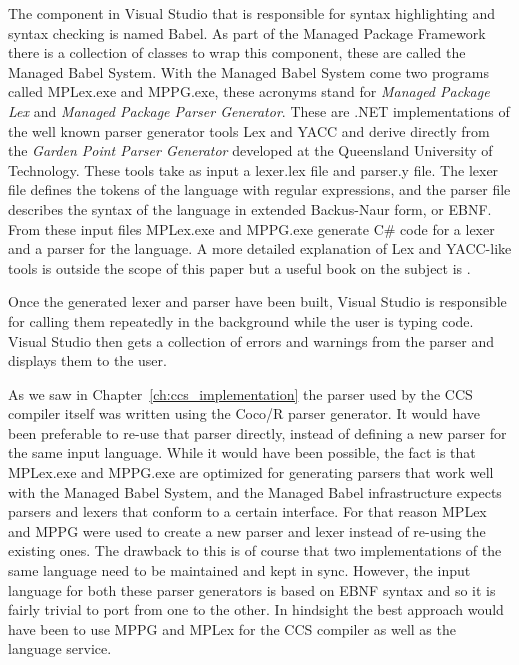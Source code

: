 	The component in Visual Studio that is responsible for syntax highlighting 
	and syntax checking is named Babel. As part of the Managed Package Framework 
	there is a collection of classes to wrap this component, these are called 
	the Managed Babel System. With the Managed Babel System come two programs 
	called MPLex.exe and MPPG.exe, these acronyms stand for \textit{Managed 
	Package Lex} and \textit{Managed Package Parser Generator}. These are .NET 
	implementations of the well known parser generator tools Lex and YACC and 
	derive directly from the \textit{Garden Point Parser Generator} \cite{gppg} 
	developed at the Queensland University of Technology. These tools take as 
	input a \textsf{lexer.lex} file and
	\textsf{parser.y} file. The lexer file defines the tokens of the language
	with regular expressions, and the parser file describes the syntax of the
	language in extended Backus-Naur form, or EBNF. From these input files 
	MPLex.exe and MPPG.exe generate C\# code for a lexer and a parser for the 
	language. A more detailed explanation of Lex and YACC-like tools is outside 
	the scope of this paper but a useful book on the subject is \cite{lexyacc}. 
	
	Once the generated lexer and parser have been built, Visual Studio is 
	responsible for calling them repeatedly in the background while the user is 
	typing code. Visual Studio then gets a collection of errors and warnings 
	from the parser and displays them to the user. 

	As we saw in Chapter~\ref{ch:ccs_implementation} the parser used by the CCS 
	compiler itself was written using the Coco/R parser generator. It would have 
	been preferable to re-use that parser directly, instead of defining a new 
	parser for the same input language. While it would have been possible, the 
	fact is that MPLex.exe and MPPG.exe are optimized for generating parsers 
	that work well with the Managed Babel System, and the Managed Babel 
	infrastructure expects parsers and lexers that conform to a certain 
	interface. For that reason MPLex and MPPG were used to create a new parser 
	and lexer instead of re-using the existing ones. The drawback to this is of 
	course that two implementations of the same language need to be maintained 
	and kept in sync. However, the input language for both these parser 
	generators is based on EBNF syntax and so it is fairly trivial to port from 
	one to the other. In hindsight the best approach would have been to use MPPG 
	and MPLex for the CCS compiler as well as the language service.
	
